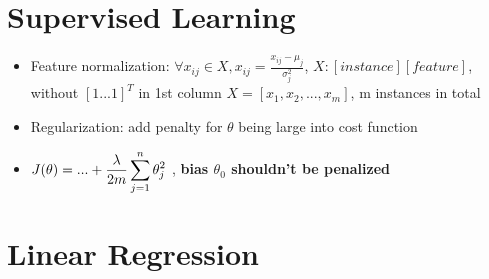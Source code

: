 \section{Supervised Learning}
\begin{itemize}

\item Feature normalization: $\forall x_{ij} \in X, x_{ij}=\frac{x_{ij}-\mu_j}{\sigma_j^2}$, $ X:[instance][feature]$, without $[1...1]^T$ in 1st column $X=[x_1,x_2,...,x_m]$, m instances in total
\item Regularization: add penalty for $\theta$ being large into cost function
\item $\displaystyle J(\theta)= \space... + \frac{\lambda}{2m}\sum^n_{j=1}\theta_j^2$ , \textbf{bias $\theta_0$ shouldn't be penalized} 

\end{itemize}

\section{Linear Regression}

